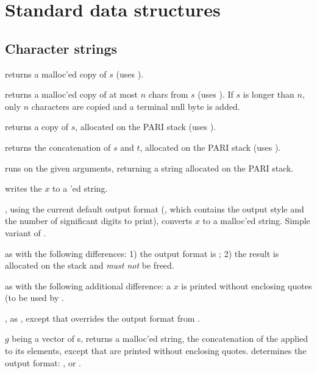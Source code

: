 \newpage
\chapter{Standard data structures}

\section{Character strings}


 returns a malloc'ed copy of $s$
(uses ).

 returns a malloc'ed copy of
at most $n$ chars from $s$ (uses ). If $s$ is longer than
$n$, only $n$ characters are copied and a terminal null byte is added.

 returns a copy of $s$, allocated
on the PARI stack (uses ).

 returns the
concatenation of $s$ and $t$, allocated on the PARI stack (uses
).

 runs 
on the given arguments, returning a string allocated on the PARI stack.

 writes the  $x$ to a 'ed
string.

, using the current default output format
(, which contains the output style and the number of
significant digits to print), converts $x$ to a malloc'ed string. Simple
variant of .

 as  with the following
differences: 1) the output format is ; 2) the result is allocated
on the stack and \emph{must not} be freed.

 as  with the following
additional difference: a  $x$ is printed without enclosing quotes
(to be used by .

, as , except that
 overrides the output format from .

 $g$ being a vector of s,
returns a malloc'ed string, the concatenation of the  applied
to its elements, except that  are printed without enclosing quotes.
 determines the output format: , 
or .

